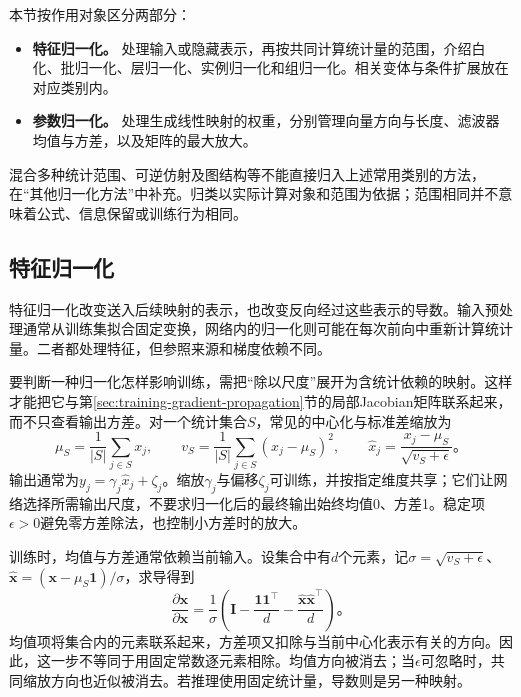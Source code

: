 本节按作用对象区分两部分：
\begin{itemize}
  \item \textbf{特征归一化。} 处理输入或隐藏表示，再按共同计算统计量的范围，介绍白化、批归一化、层归一化、实例归一化和组归一化。相关变体与条件扩展放在对应类别内。
  \item \textbf{参数归一化。} 处理生成线性映射的权重，分别管理向量方向与长度、滤波器均值与方差，以及矩阵的最大放大。
\end{itemize}
混合多种统计范围、可逆仿射及图结构等不能直接归入上述常用类别的方法，在“其他归一化方法”中补充。归类以实际计算对象和范围为依据；范围相同并不意味着公式、信息保留或训练行为相同。

\subsection{特征归一化}
\label{sec:training-feature-normalization-methods}
\label{sec:training-normalization-principles}
特征归一化改变送入后续映射的表示，也改变反向经过这些表示的导数。输入预处理通常从训练集拟合固定变换，网络内的归一化则可能在每次前向中重新计算统计量。二者都处理特征，但参照来源和梯度依赖不同。

要判断一种归一化怎样影响训练，需把“除以尺度”展开为含统计依赖的映射。这样才能把它与第\ref{sec:training-gradient-propagation}节的局部Jacobian矩阵联系起来，而不只查看输出方差。对一个统计集合$S$，常见的中心化与标准差缩放为
\begin{equation}
  \mu_S=\frac1{|S|}\sum_{j\in S}x_j,\qquad
  v_S=\frac1{|S|}\sum_{j\in S}(x_j-\mu_S)^2,\qquad
  \hat x_j=\frac{x_j-\mu_S}{\sqrt{v_S+\epsilon}}\text{。}
  \label{eq:training-normalization-common}
\end{equation}
输出通常为$y_j=\gamma_j\hat x_j+\zeta_j$。缩放$\gamma_j$与偏移$\zeta_j$可训练，并按指定维度共享；它们让网络选择所需输出尺度，不要求归一化后的最终输出始终均值0、方差1。稳定项$\epsilon>0$避免零方差除法，也控制小方差时的放大。

训练时，均值与方差通常依赖当前输入。设集合中有$d$个元素，记$\sigma=\sqrt{v_S+\epsilon}$、$\hat{\bm x}=(\bm x-\mu_S\bm1)/\sigma$，求导得到
\begin{equation}
  \frac{\partial\hat{\bm x}}{\partial\bm x}
  =\frac1\sigma\left(\bm I-\frac{\bm1\bm1^{\top}}d
                          -\frac{\hat{\bm x}\hat{\bm x}^{\top}}d\right)\text{。}
  \label{eq:training-normalization-jacobian}
\end{equation}
均值项将集合内的元素联系起来，方差项又扣除与当前中心化表示有关的方向。因此，这一步不等同于用固定常数逐元素相除。均值方向被消去；当$\epsilon$可忽略时，共同缩放方向也近似被消去。若推理使用固定统计量，导数则是另一种映射。

